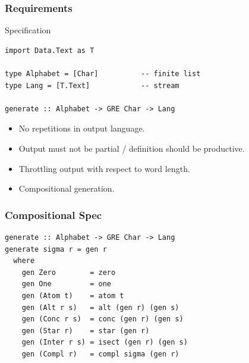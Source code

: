 \documentclass[pdftex,aspectratio=169]{beamer}
\begin{document}
\begin{frame}[fragile]
  \frametitle{Requirements}
  \vspace{-\baselineskip}
  \begin{block}{Specification}
\begin{lstlisting}[numbers=none]
import Data.Text as T

type Alphabet = [Char]          -- finite list
type Lang = [T.Text]            -- stream

generate :: Alphabet -> GRE Char -> Lang
\end{lstlisting}
  \end{block}
  \begin{itemize}
  \item No repetitions in output language.
  \item Output must not be partial / definition should be productive.
  \item Throttling output with respect to word length.
  \item Compositional generation.
  \end{itemize}
\end{frame}
\begin{frame}[fragile]
  \frametitle{Compositional Spec}
\begin{lstlisting}[numbers=none]
generate :: Alphabet -> GRE Char -> Lang
generate sigma r = gen r
  where
    gen Zero        = zero
    gen One         = one
    gen (Atom t)    = atom t
    gen (Alt r s)   = alt (gen r) (gen s)
    gen (Conc r s)  = conc (gen r) (gen s)
    gen (Star r)    = star (gen r)
    gen (Inter r s) = isect (gen r) (gen s)
    gen (Compl r)   = compl sigma (gen r)
\end{lstlisting}
\end{frame}





\end{document}
